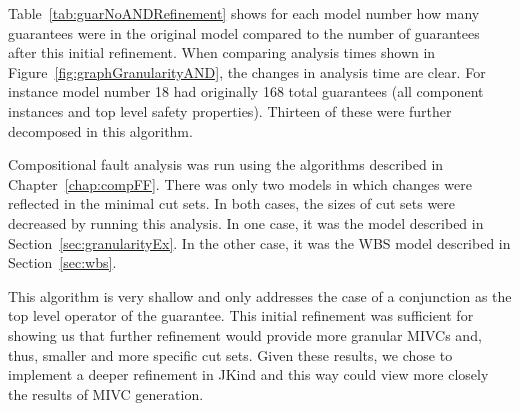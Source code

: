 Table~\ref{tab:guarNoANDRefinement} shows for each model number how many guarantees were in the original model compared to the number of guarantees after this initial refinement. When comparing analysis times shown in Figure~\ref{fig:graphGranularityAND}, the changes in analysis time are clear. For instance model number 18 had originally 168 total guarantees (all component instances and top level safety properties). Thirteen of these were further decomposed in this algorithm.  

Compositional fault analysis was run using the algorithms described in Chapter~\ref{chap:compFF}. There was only two models in which changes were reflected in the minimal cut sets. In both cases, the sizes of cut sets were decreased by running this analysis. In one case, it was the model described in Section~\ref{sec:granularityEx}. In the other case, it was the WBS model described in Section~\ref{sec:wbs}. 

This algorithm is very shallow and only addresses the case of a conjunction as the top level operator of the guarantee. This initial refinement was sufficient for showing us that further refinement would provide more granular MIVCs and, thus, smaller and more specific cut sets. Given these results, we chose to implement a deeper refinement in JKind and this way could view more closely the results of MIVC generation. 